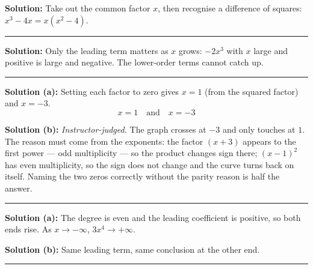 \documentclass[12pt]{article}
\begin{document}



\textbf{Solution:} Take out the common factor $x$, then recognise a difference of squares: $x^{3} - 4x = x\left(x^{2} - 4\right)$. 

\vspace{0.1cm}\noindent\rule{\linewidth}{0.2pt}


\textbf{Solution:} Only the leading term matters as $x$ grows: $-2x^{3}$ with $x$ large and positive is large and negative. The lower-order terms cannot catch up. 

\vspace{0.1cm}\noindent\rule{\linewidth}{0.2pt}


\textbf{Solution (a):} Setting each factor to zero gives $x = 1$ (from the squared factor) and $x = -3$.
\[ \boxed{x = 1 \quad \text{and} \quad x = -3} \]

\textbf{Solution (b):} \emph{Instructor-judged.} The graph crosses at $-3$ and only touches at $1$. The reason must come from the exponents: the factor $(x+3)$ appears to the first power --- odd multiplicity --- so the product changes sign there; $(x-1)^{2}$ has even multiplicity, so the sign does not change and the curve turns back on itself. Naming the two zeros correctly without the parity reason is half the answer.

\vspace{0.1cm}\noindent\rule{\linewidth}{0.2pt}


\textbf{Solution (a):} The degree is even and the leading coefficient is positive, so both ends rise. As $x \to -\infty$, $3x^{4} \to +\infty$. 

\textbf{Solution (b):} Same leading term, same conclusion at the other end. 

\vspace{0.1cm}\noindent\rule{\linewidth}{0.2pt}
\end{document}
